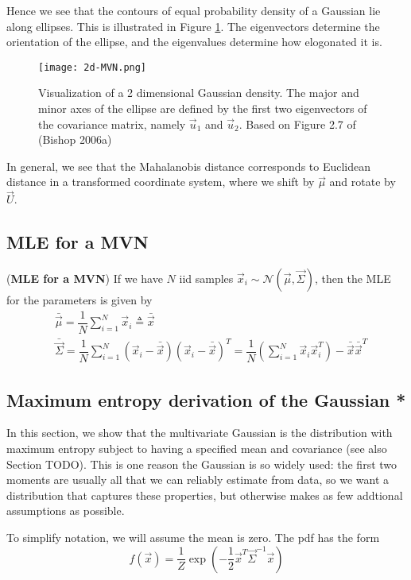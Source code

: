 Hence we see that the contours of equal probability density of a Gaussian lie along ellipses. This is illustrated in Figure \ref{fig:2d-MVN}. The eigenvectors determine the orientation of the ellipse, and the eigenvalues determine how elogonated it is.

\begin{figure}[hbtp]
\centering
    \texttt{[image: 2d-MVN.png]}
\caption{Visualization of a 2 dimensional Gaussian density. The major and minor axes of the ellipse are defined by the first two eigenvectors of the covariance matrix, namely $\vec{u}_1$ and $\vec{u}_2$. Based on Figure 2.7 of (Bishop 2006a)}
\label{fig:2d-MVN} 
\end{figure}

In general, we see that the Mahalanobis distance corresponds to Euclidean distance in a transformed coordinate system, where we shift by $\vec{\mu}$ and rotate by $\vec{U}$.


\subsection{MLE for a MVN}
\begin{theorem}(\textbf{MLE for a MVN})
If we have $N$ iid samples $\vec{x}_i \sim \mathcal{N}(\vec{\mu},\vec{\Sigma})$, then the MLE for the parameters is given by
\begin{align}
& \bar{\vec{\mu}}=\dfrac{1}{N}\sum\limits_{i=1}^N \vec{x}_i \triangleq \bar{\vec{x}} \\
& \bar{\vec{\Sigma}}=\dfrac{1}{N}\sum\limits_{i=1}^N (\vec{x}_i-\bar{\vec{x}})(\vec{x}_i-\bar{\vec{x}})^T=\dfrac{1}{N}\left(\sum\limits_{i=1}^N \vec{x}_i\vec{x}_i^T\right)-\bar{\vec{x}}\bar{\vec{x}}^T
\end{align}
\end{theorem}


\subsection{Maximum entropy derivation of the Gaussian *}
In this section, we show that the multivariate Gaussian is the distribution with maximum entropy subject to having a specified mean and covariance (see also Section TODO). This is one reason the Gaussian is so widely used: the first two moments are usually all that we can reliably estimate from data, so we want a distribution that captures these properties, but otherwise makes as few addtional assumptions as possible.

To simplify notation, we will assume the mean is zero. The pdf has the form
\begin{equation}
f(\vec{x})=\dfrac{1}{Z}\exp\left(-\dfrac{1}{2}\vec{x}^T\vec{\Sigma}^{-1}\vec{x}\right)
\end{equation}


